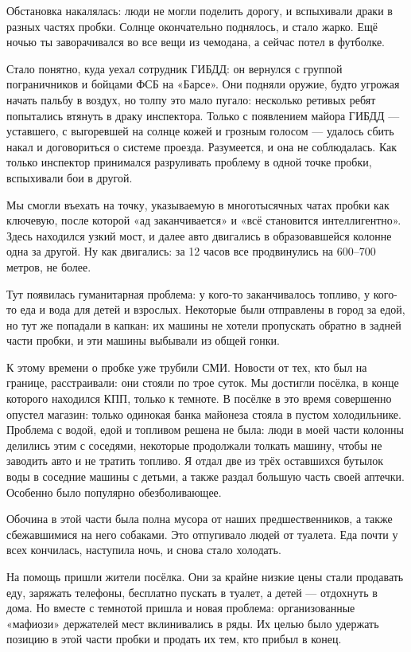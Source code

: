 Обстановка накалялась: люди не могли поделить дорогу, и вспыхивали драки в разных частях пробки. Солнце окончательно поднялось, и стало жарко. Ещё ночью ты заворачивался во все вещи из чемодана, а сейчас потел в футболке.

Стало понятно, куда уехал сотрудник ГИБДД: он вернулся с группой пограничников и бойцами ФСБ на «Барсе». Они подняли оружие, будто угрожая начать пальбу в воздух, но толпу это мало пугало: несколько ретивых ребят попытались втянуть в драку инспектора. Только с появлением майора ГИБДД — уставшего, с выгоревшей на солнце кожей и грозным голосом — удалось сбить накал и договориться о системе проезда. Разумеется, и она не соблюдалась. Как только инспектор принимался разруливать проблему в одной точке пробки, вспыхивали бои в другой.

Мы смогли въехать на точку, указываемую в многотысячных чатах пробки как ключевую, после которой «ад заканчивается» и «всё становится интеллигентно». Здесь находился узкий мост, и далее авто двигались в образовавшейся колонне одна за другой. Ну как двигались: за 12 часов все продвинулись на 600–700 метров, не более.

Тут появилась гуманитарная проблема: у кого-то заканчивалось топливо, у кого-то еда и вода для детей и взрослых. Некоторые были отправлены в город за едой, но тут же попадали в капкан: их машины не хотели пропускать обратно в задней части пробки, и эти машины выбывали из общей гонки.

К этому времени о пробке уже трубили СМИ. Новости от тех, кто был на границе, расстраивали: они стояли по трое суток. Мы достигли посёлка, в конце которого находился КПП, только к темноте. В посёлке в это время совершенно опустел магазин: только одинокая банка майонеза стояла в пустом холодильнике. Проблема с водой, едой и топливом решена не была: люди в моей части колонны делились этим с соседями, некоторые продолжали толкать машину, чтобы не заводить авто и не тратить топливо. Я отдал две из трёх оставшихся бутылок воды в соседние машины с детьми, а также раздал большую часть своей аптечки. Особенно было популярно обезболивающее.


Обочина в этой части была полна мусора от наших предшественников, а также сбежавшимися на него собаками. Это отпугивало людей от туалета. Еда почти у всех кончилась, наступила ночь, и снова стало холодать.

На помощь пришли жители посёлка. Они за крайне низкие цены стали продавать еду, заряжать телефоны, бесплатно пускать в туалет, а детей — отдохнуть в дома. Но вместе с темнотой пришла и новая проблема: организованные «мафиози» держателей мест вклинивались в ряды. Их целью было удержать позицию в этой части пробки и продать их тем, кто прибыл в конец.

